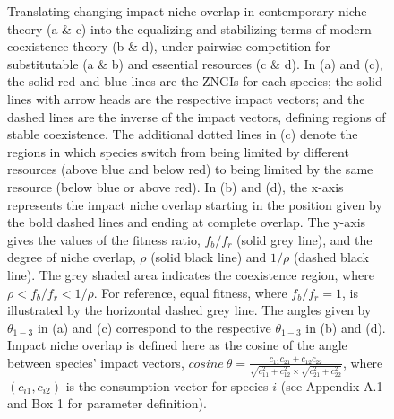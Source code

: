 \newpage
\begin{figure}[h!]
\centering
{}
\caption[Translating changing impact niche overlap in contemporary niche theory into the equalizing and stabilizing terms of modern coexistence theory, under pairwise competition for substitutable and essential resources.]
	{\hspace{1mm}Translating changing impact niche overlap in contemporary niche theory (a \& c) into the equalizing and stabilizing terms of modern coexistence theory (b \& d), under pairwise competition for substitutable (a \& b) and essential resources (c \& d). In (a) and (c), the solid red and blue lines are the ZNGIs for each species; the solid lines with arrow heads are the respective impact vectors; and the dashed lines are the inverse of the impact vectors, defining regions of stable coexistence. The additional dotted lines in (c) denote the regions in which species switch from being limited by different resources (above blue and below red) to being limited by the same resource (below blue or above red). In (b) and (d), the x-axis represents the impact niche overlap starting in the position given by the bold dashed lines and ending at complete overlap. The y-axis gives the values of the fitness ratio, $f_{b}/f_{r}$ (solid grey line), and the degree of niche overlap, $\rho$ (solid black line) and $1/\rho$ (dashed black line). The grey shaded area indicates the coexistence region, where $\rho<f_{b}/f_{r}<1/\rho$. For reference, equal fitness, where $f_{b}/f_{r}=1$, is illustrated by the horizontal dashed grey line. The angles given by $\theta_{1-3}$ in (a) and (c) correspond to the respective $\theta_{1-3}$ in (b) and (d). Impact niche overlap is defined here as the cosine of the angle between species' impact vectors, $\mathit{cosine}\ \theta = \frac{c_{11}c_{21}+c_{12}c_{22}}{\sqrt{c_{11}^{2}+c_{12}^{2}}\times \sqrt{c_{21}^{2}+c_{22}^{2}}}$, where $\left (c_{i1}, c_{i2}\right )$ is the consumption vector for species $\mathit{i}$ (see Appendix A.1 and Box 1 for parameter definition).}
\label{fig:impact-ms-fig}
\end{figure}
